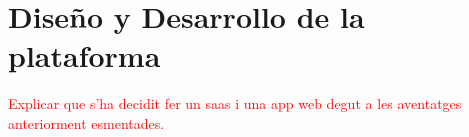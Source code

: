 \chapter{Diseño y Desarrollo de la plataforma}
\label{chap:diseno_desarrollo}

\textcolor{red}{Explicar que s'ha decidit fer un saas i una app web degut a les aventatges anteriorment esmentades.}
